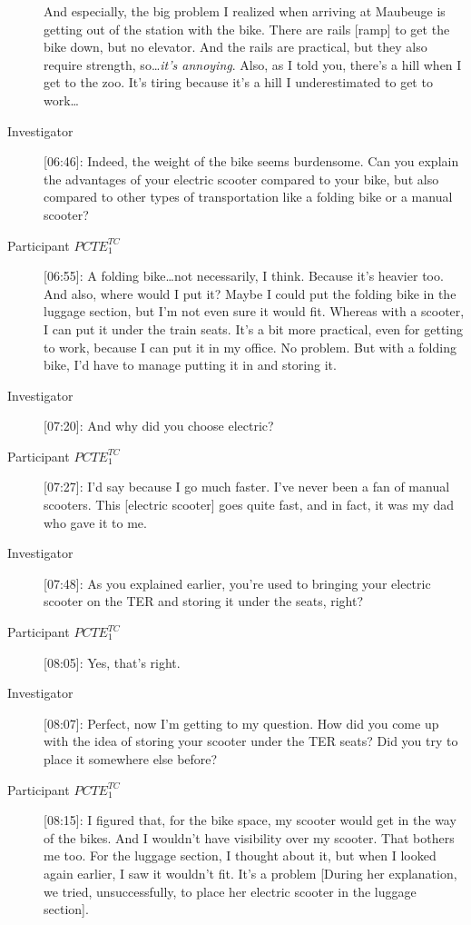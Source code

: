 \begin{description}
    And especially, the big problem I realized when arriving at Maubeuge is getting out of the station with the bike. There are rails [ramp] to get the bike down, but no elevator. And the rails are practical, but they also require strength, so\dots \textsl{it’s annoying}. Also, as I told you, there’s a hill when I get to the zoo. It’s tiring because it’s a hill I underestimated to get to work\dots
    \item[Investigator] [06:46]: Indeed, the weight of the bike seems burdensome. Can you explain the advantages of your electric scooter compared to your bike, but also compared to other types of transportation like a folding bike or a manual scooter?
    \item[Participant \(PCTE^{TC}_{1}\)] [06:55]: A folding bike\dots not necessarily, I think. Because it’s heavier too. And also, where would I put it? Maybe I could put the folding bike in the luggage section, but I’m not even sure it would fit. Whereas with a scooter, I can put it under the train seats. It’s a bit more practical, even for getting to work, because I can put it in my office. No problem. But with a folding bike, I’d have to manage putting it in and storing it.
    \item[Investigator] [07:20]: And why did you choose electric?
    \item[Participant \(PCTE^{TC}_{1}\)] [07:27]: I’d say because I go much faster. I’ve never been a fan of manual scooters. This [electric scooter] goes quite fast, and in fact, it was my dad who gave it to me.
    \item[Investigator] [07:48]: As you explained earlier, you’re used to bringing your electric scooter on the \acrshort{TER} and storing it under the seats, right?
    \item[Participant \(PCTE^{TC}_{1}\)] [08:05]: Yes, that’s right.
    \item[Investigator] [08:07]: Perfect, now I’m getting to my question. How did you come up with the idea of storing your scooter under the \acrshort{TER} seats? Did you try to place it somewhere else before?
    \item[Participant \(PCTE^{TC}_{1}\)] [08:15]: I figured that, for the bike space, my scooter would get in the way of the bikes. And I wouldn’t have visibility over my scooter. That bothers me too. For the luggage section, I thought about it, but when I looked again earlier, I saw it wouldn’t fit. It’s a problem [During her explanation, we tried, unsuccessfully, to place her electric scooter in the luggage section].%
    

\end{description}
